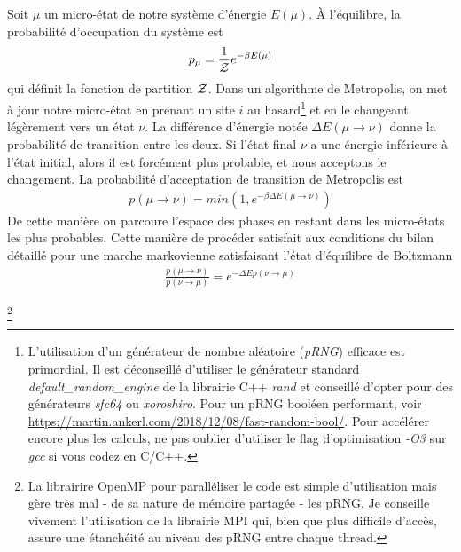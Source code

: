 Soit $\mu$ un micro-état de notre système d'énergie $E(\mu)$. À l'équilibre\cite{gibbs}, la probabilité d'occupation du système est
\begin{align}
	p_\mu = \frac{1}{\mathcal{Z}} e^{-\beta E(\mu)}
\end{align}
qui définit la fonction de partition $\mathcal{Z}$. Dans un algorithme de Metropolis, on met à jour notre micro-état en prenant un site $i$ au hasard\footnote{L'utilisation d'un générateur de nombre aléatoire (\textit{pRNG}) efficace est primordial. Il est déconseillé d'utiliser le générateur standard \textit{default\_random\_engine} de la librairie C++ \textit{rand} et conseillé d'opter pour des générateurs \textit{sfc64} ou \textit{xoroshiro}. Pour un pRNG booléen performant, voir \url{https://martin.ankerl.com/2018/12/08/fast-random-bool/}. Pour accélérer encore plus les calculs, ne pas oublier d'utiliser le flag d'optimisation \textit{-O3}  sur \textit{gcc} si vous codez en C/C++.} et en le changeant légèrement vers un état $\nu$. La différence d'énergie notée $\Delta E(\mu \rightarrow \nu)$ donne la probabilité de transition entre les deux. Si l'état final $\nu$ a une énergie inférieure à l'état initial, alors il est forcément plus probable, et nous acceptons le changement. La probabilité d'acceptation de transition de Metropolis est 
\begin{align}
	p(\mu \rightarrow \nu) = min(1,e^{-\beta \Delta E(\mu \rightarrow \nu)})
\end{align}
De cette manière on parcoure l'espace des phases en restant dans les micro-états les plus probables. Cette manière de procéder satisfait aux conditions du bilan détaillé pour une marche markovienne satisfaisant l'état d'équilibre de Boltzmann
\begin{align}
\frac{p(\mu \rightarrow \nu)}{p(\nu \rightarrow \mu)} = e^{-\Delta Ep(\nu \rightarrow \mu)}
\end{align}

\footnote{La librairire OpenMP pour paralléliser le code est simple d'utilisation mais gère très mal - de sa nature de mémoire partagée - les pRNG. Je conseille vivement l'utilisation de la librairie MPI qui, bien que plus difficile d'accès, assure une étanchéité au niveau des pRNG entre chaque thread.}

